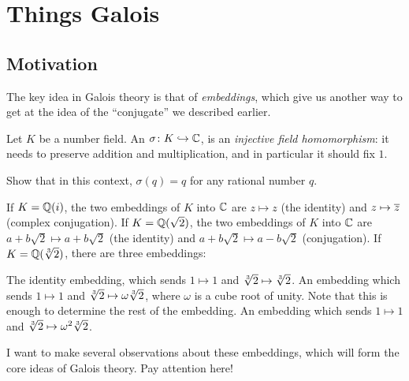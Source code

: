 \chapter{Things Galois}
\label{ch:galois_theory}

\section{Motivation}
The key idea in Galois theory is that of \emph{embeddings},
which give us another way to get at the idea of the ``conjugate'' we described earlier.

Let $K$ be a number field.
An  $\sigma \colon K \hookrightarrow \mathbb C$,
is an \emph{injective field homomorphism}:
it needs to preserve addition and multiplication,
and in particular it should fix $1$.
\begin{ques}
	Show that in this context, $\sigma(q) = q$ for any rational number $q$.
\end{ques}

\begin{example}
	\listhack
	\begin{enumerate}[(a)]
		\ii If $K = \mathbb Q(i)$, the two embeddings of $K$ into $\mathbb C$ are
		$z \mapsto z$ (the identity) and $z \mapsto \overline z$ (complex conjugation).
		\ii If $K = \mathbb Q(\sqrt 2)$, the two embeddings of $K$ into $\mathbb C$ are
		$a+b\sqrt 2 \mapsto a+b\sqrt 2$ (the identity) and $a+b\sqrt 2 \mapsto a-b\sqrt 2$ (conjugation).
		\ii If $K = \mathbb Q(\sqrt[3]{2})$, there are three embeddings:
		\begin{itemize}
			\ii The identity embedding, which sends $1 \mapsto 1$ and $\sqrt[3]{2} \mapsto \sqrt[3]{2}$.
			\ii An embedding which sends $1 \mapsto 1$ and $\sqrt[3]{2} \mapsto \omega \sqrt[3]{2}$,
			where $\omega$ is a cube root of unity.
			Note that this is enough to determine the rest of the embedding.
			\ii An embedding which sends $1 \mapsto 1$ and $\sqrt[3]{2} \mapsto \omega^2 \sqrt[3]{2}$.
		\end{itemize}
	\end{enumerate}
\end{example}

I want to make several observations about these embeddings,
which will form the core ideas of Galois theory.
Pay attention here!

